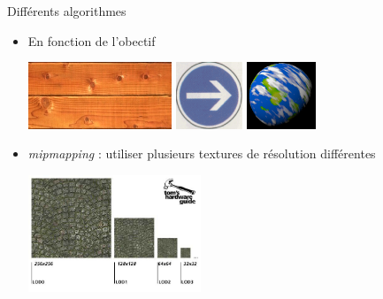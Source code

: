 \begin{frame}[t]{Différents algorithmes}
\begin{itemize}
  \item En fonction de l'obectif
  \begin{center}
\includegraphics[height=2cm]{figs/parquet.png}
\hspace{1cm}
\includegraphics[height=2cm]{figs/panneau.png}
\hspace{1cm}
\includegraphics[height=2cm]{figs/planete.png}
  \end{center}
  \item \emph{mipmapping} : utiliser plusieurs textures de résolution différentes
  \begin{center}
\includegraphics[height=3.5cm]{figs/mipmaps.jpg}
  \end{center}
\end{itemize}
\end{frame}

